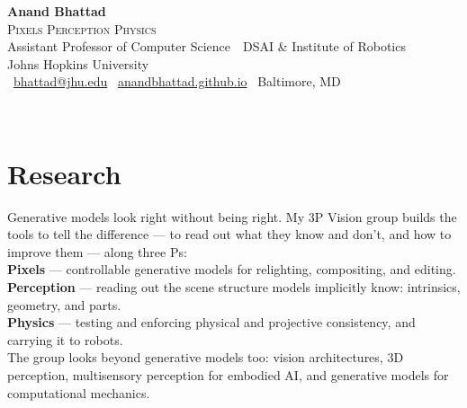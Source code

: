 
\color{ink}

\ifteasers\vspace*{-0.12in}\fi
\hspace*{-\mhpull}\begin{minipage}{\dimexpr\linewidth+\mhpull\relax}
{\sffamily\bfseries\fontsize{25}{29}\selectfont\color{ink}Anand Bhattad}\\[2pt]
{\sffamily\footnotesize\color{accent}\scshape Pixels\,\textperiodcentered\,Perception\,\textperiodcentered\,Physics}\\[4pt]
{\sffamily\normalsize\color{darkgray}Assistant Professor of Computer Science
  \,\textperiodcentered\, DSAI \& Institute of Robotics
  \\ Johns Hopkins University}\\[4pt]
{\small\color{muted}%
  \faEnvelope[regular]~\href{mailto:bhattad@jhu.edu}{bhattad@jhu.edu}\quad
  \faGlobe~\href{https://anandbhattad.github.io/}{anandbhattad.github.io}\quad
  \faMapMarker*~Baltimore, MD}
\end{minipage}\\[4pt]
\hspace*{-\mhpull}{\color{accent}\rule{\dimexpr\linewidth+\mhpull\relax}{1.2pt}}
\section{Research}
Generative models look right without being right. My 3P Vision group builds the tools to tell the difference --- to read out what they know and don't, and how to improve them --- along three Ps:\\[5pt]
\textbf{\textcolor{accent}{Pixels}} --- controllable generative models for relighting, compositing, and editing.\\[3pt]
\textbf{\textcolor{accent}{Perception}} --- reading out the scene structure models implicitly know: intrinsics, geometry, and parts.\\[3pt]
\textbf{\textcolor{accent}{Physics}} --- testing and enforcing physical and projective consistency, and carrying it to robots.\\[5pt]
The group looks beyond generative models too: vision architectures, 3D perception, multisensory perception for embodied AI, and generative models for computational mechanics.\\[5pt]
\iffull\ifteasers{}\fi\fi
